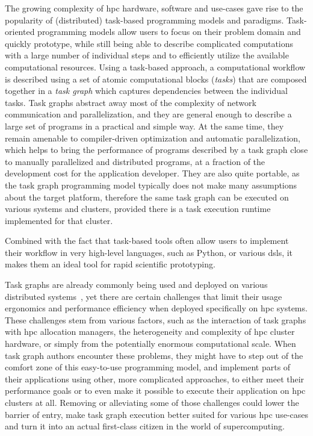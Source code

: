 The growing complexity of \gls{hpc} hardware, software and use-cases gave rise to the
popularity of (distributed) task-based programming models and paradigms. Task-oriented programming
models allow users to focus on their problem domain and quickly prototype, while still being able
to describe complicated computations with a large number of individual steps and to efficiently
utilize the available computational resources. Using a task-based approach, a computational
workflow is described using a set of atomic computational blocks (\emph{tasks}) that are
composed together in a \emph{task graph} which captures dependencies between the individual
tasks. Task graphs abstract away most of the complexity of network communication and
parallelization, and they are general enough to describe a large set of programs in a practical and
simple way. At the same time, they remain amenable to compiler-driven optimization and automatic
parallelization, which helps to bring the performance of programs described by a task graph close
to manually parallelized and distributed programs, at a fraction of the development cost for the
application developer. They are also quite portable, as the task graph programming model typically
does not make many assumptions about the target platform, therefore the same task graph can be
executed on various systems and clusters, provided there is a task execution runtime implemented
for that cluster.

Combined with the fact that task-based tools often allow users to implement their workflow in very
high-level languages, such as Python, or various \glspl{dsl}, it makes them an ideal
tool for rapid scientific prototyping.

Task graphs are already commonly being used and deployed on various distributed
systems~\cite{pegasus, workflows_at_scale, large_scale_modelling}, yet there are certain challenges that limit their usage ergonomics
and performance efficiency when deployed specifically on \gls{hpc} systems. These
challenges stem from various factors, such as the interaction of task graphs with
\gls{hpc} allocation managers, the heterogeneity and complexity of
\gls{hpc} cluster hardware, or simply from the potentially enormous computational
scale. When task graph authors encounter these problems, they might have to step out of the comfort
zone of this easy-to-use programming model, and implement parts of their applications using other,
more complicated approaches, to either meet their performance goals or to even make it possible to
execute their application on \gls{hpc} clusters at all. Removing or alleviating some
of those challenges could lower the barrier of entry, make task graph execution better suited for
various \gls{hpc} use-cases and turn it into an actual first-class citizen in the
world of supercomputing\@.

